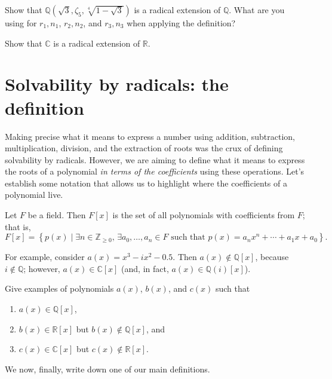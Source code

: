 \begin{problem}
Show that  $\mathbb{Q}\left(\sqrt{3},\zeta_5,\sqrt[4]{1 - \sqrt{3}}\right)$ is a radical extension of $\mathbb{Q}$. What are you using for $r_1,n_1$, $r_2, n_2$, and $r_3, n_3$ when applying the definition?
\end{problem}

\begin{problem}
Show that $\mathbb{C}$ is a radical extension of $\mathbb{R}$.
\end{problem}

\section{Solvability by radicals: the definition}
Making precise what it means to express a number using addition, subtraction, multiplication, division, and the extraction of roots was the crux of defining solvability by radicals. However, we are aiming to define what it means to express the roots of a polynomial \emph{in terms of the coefficients} using these operations. Let's establish some notation that allows us to highlight where the coefficients of a polynomial live.

\begin{definition}\label{def.Fx}
Let $F$ be a field. Then $F[x]$ is the set of all polynomials with coefficients from $F$; that is,  $F[x] = \left\{p(x) \mid \text{$\exists n\in \mathbb{Z}_{\ge 0}$, $\exists a_0,\ldots,a_n \in F$ such that $p(x) = a_nx^n + \cdots + a_1x + a_0$}\right\}.$
\end{definition}

For example, consider $a(x) = x^3 -ix^2 -0.5$. Then  $a(x) \notin \mathbb{Q}[x]$, because $i\notin \mathbb{Q}$; however, $a(x)\in\mathbb{C}[x]$ (and, in fact, $a(x)\in\mathbb{Q}\left(i\right)[x]$).
\begin{problem}
Give examples of polynomials $a(x)$, $b(x)$, and $c(x)$ such that 
\begin{enumerate}
\item $a(x) \in \mathbb{Q}[x]$, 
\item $b(x) \in \mathbb{R}[x]$ but $b(x) \notin \mathbb{Q}[x]$, and 
\item $c(x) \in \mathbb{C}[x]$ but $c(x) \notin \mathbb{R}[x]$.
\end{enumerate}
\end{problem}
We now, finally, write down one of our  main definitions.

